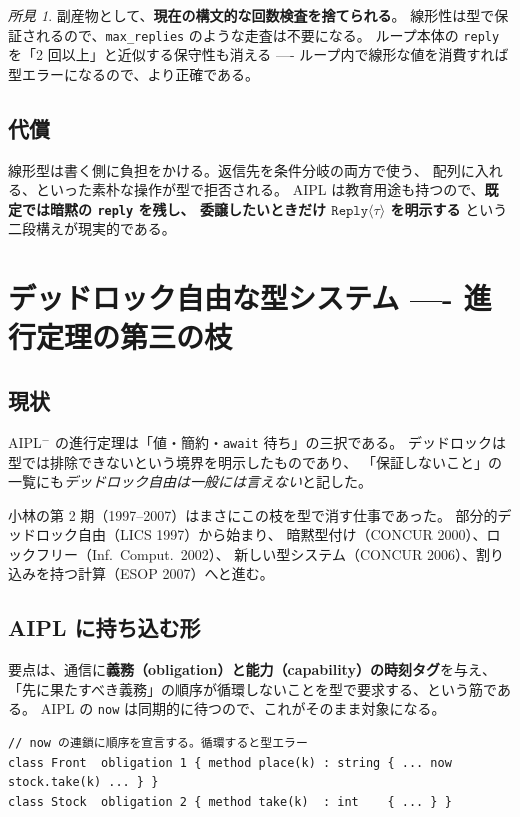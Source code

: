 \documentclass[11pt,a4paper]{ltjsarticle}
\theoremstyle{remark}
\newtheorem{finding}{所見}
\newcommand{\ty}[1]{\ensuremath{\mathtt{#1}}}
\begin{document}
\begin{finding}
副産物として、\textbf{現在の構文的な回数検査を捨てられる}。
線形性は型で保証されるので、\texttt{max\_replies} のような走査は不要になる。
ループ本体の \texttt{reply} を「2 回以上」と近似する保守性も消える
---- ループ内で線形な値を消費すれば型エラーになるので、より正確である。
\end{finding}

\subsection{代償}

線形型は書く側に負担をかける。返信先を条件分岐の両方で使う、
配列に入れる、といった素朴な操作が型で拒否される。
AIPL は教育用途も持つので、\textbf{既定では暗黙の \texttt{reply} を残し、
委譲したいときだけ \ty{Reply}$\langle\tau\rangle$ を明示する}
という二段構えが現実的である。

\section{デッドロック自由な型システム ---- 進行定理の第三の枝}

\subsection{現状}

AIPL$^-$ の進行定理は「値・簡約・\texttt{await} 待ち」の三択である。
デッドロックは型では排除できないという境界を明示したものであり、
「保証しないこと」の一覧にも\emph{デッドロック自由は一般には言えない}と記した。

小林の第 2 期（1997--2007）はまさにこの枝を型で消す仕事であった。
部分的デッドロック自由（LICS 1997）から始まり、
暗黙型付け（CONCUR 2000）、ロックフリー（Inf.\ Comput.\ 2002）、
新しい型システム（CONCUR 2006）、割り込みを持つ計算（ESOP 2007）へと進む。

\subsection{AIPL に持ち込む形}

要点は、通信に\textbf{義務（obligation）と能力（capability）の時刻タグ}を与え、
「先に果たすべき義務」の順序が循環しないことを型で要求する、という筋である。
AIPL の \texttt{now} は同期的に待つので、これがそのまま対象になる。

\begin{lstlisting}[language=AIPL]
// now の連鎖に順序を宣言する。循環すると型エラー
class Front  obligation 1 { method place(k) : string { ... now stock.take(k) ... } }
class Stock  obligation 2 { method take(k)  : int    { ... } }
\end{lstlisting}
\end{document}
